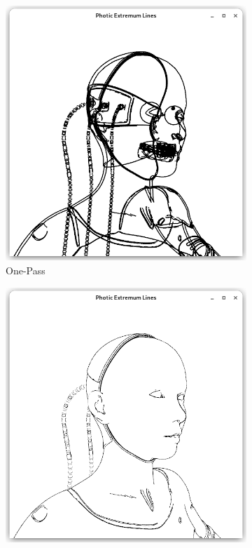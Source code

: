 \documentclass[9pt,fleqn,twoside,twocolumn]{stdglobal}
\begin{document}
    \begin{figure}[h]
      \centering
      \begin{subfigure}[b]{0.49\linewidth}
        \centering
        \includegraphics[width=\textwidth,trim={15px 15 15 50},clip]{images/cyborg-contour-pel-hidden-shader.png}
        \caption{One-Pass}
      \end{subfigure}
      \begin{subfigure}[b]{0.49\linewidth}
        \centering
        \includegraphics[width=\textwidth,trim={15px 15 15 50},clip]{images/cyborg-contour-pel-shader.png}

\end{subfigure}
\end{figure}
\end{document}
